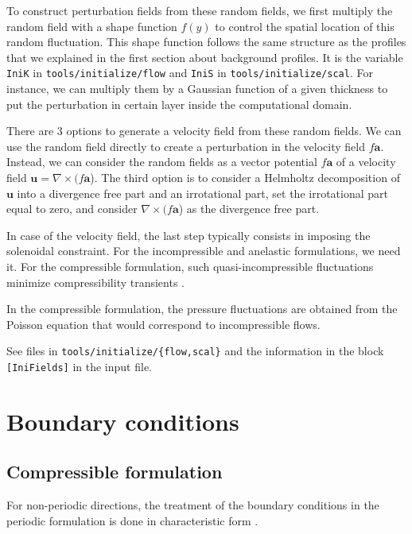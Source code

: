 To construct perturbation fields from these random fields, we first multiply the random field with a shape function $f(y)$ to control the spatial location of this random fluctuation. This shape function follows the same structure as the profiles that we explained in the first section about background profiles. It is the variable \texttt{IniK} in \texttt{tools/initialize/flow} and \texttt{IniS} in \texttt{tools/initialize/scal}. For instance, we can multiply them by a Gaussian function of a given thickness to put the perturbation in certain layer inside the computational domain.

There are 3 options to generate a velocity field from these random fields. We can use the random field directly to create a perturbation in the velocity field $f\mathbf{a}$. Instead, we can consider the random fields as a vector potential $f\mathbf{a}$ of a velocity field $\mathbf{u}=\nabla\times(f\mathbf{a}$). The third option is to consider a Helmholtz decomposition of $\mathbf{u}$ into a divergence free part and an irrotational part, set the irrotational part equal to zero, and consider $\nabla\times(f\mathbf{a}$) as the  divergence free part.

In case of the velocity field, the last step typically consists in imposing the solenoidal constraint. For the incompressible and anelastic formulations, we need it. For the compressible formulation, such quasi-incompressible fluctuations minimize compressibility transients \cite{Erlebacher:1990}. 

In the compressible formulation, the pressure fluctuations are obtained from the Poisson equation that would correspond to incompressible flows.

See files in \texttt{tools/initialize/\{flow,scal\}} and the information in the block \texttt{[IniFields]} in the input file. 

\section{Boundary conditions}

\subsection{Compressible formulation}

For non-periodic directions, the treatment of the boundary conditions in the
periodic formulation is done in characteristic form
\citep{Thompson:1987,Thompson:1990,Lodato:2008}.

